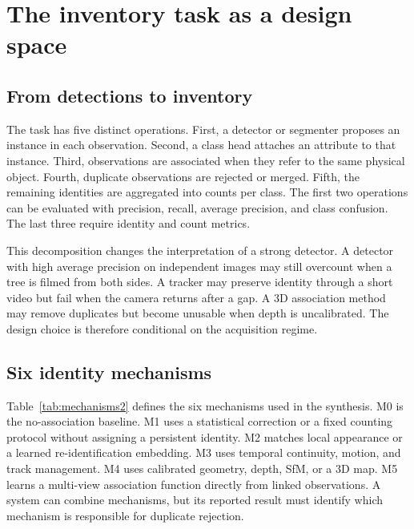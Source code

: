 \section{The inventory task as a design space}
\label{sec:designspace2}

\subsection{From detections to inventory}

The task has five distinct operations. First, a detector or segmenter proposes an instance in each observation. Second, a class head attaches an attribute to that instance. Third, observations are associated when they refer to the same physical object. Fourth, duplicate observations are rejected or merged. Fifth, the remaining identities are aggregated into counts per class. The first two operations can be evaluated with precision, recall, average precision, and class confusion. The last three require identity and count metrics.

This decomposition changes the interpretation of a strong detector. A detector with high average precision on independent images may still overcount when a tree is filmed from both sides. A tracker may preserve identity through a short video but fail when the camera returns after a gap. A 3D association method may remove duplicates but become unusable when depth is uncalibrated. The design choice is therefore conditional on the acquisition regime.

\subsection{Six identity mechanisms}

Table~\ref{tab:mechanisms2} defines the six mechanisms used in the synthesis. M0 is the no-association baseline. M1 uses a statistical correction or a fixed counting protocol without assigning a persistent identity. M2 matches local appearance or a learned re-identification embedding. M3 uses temporal continuity, motion, and track management. M4 uses calibrated geometry, depth, SfM, or a 3D map. M5 learns a multi-view association function directly from linked observations. A system can combine mechanisms, but its reported result must identify which mechanism is responsible for duplicate rejection.


